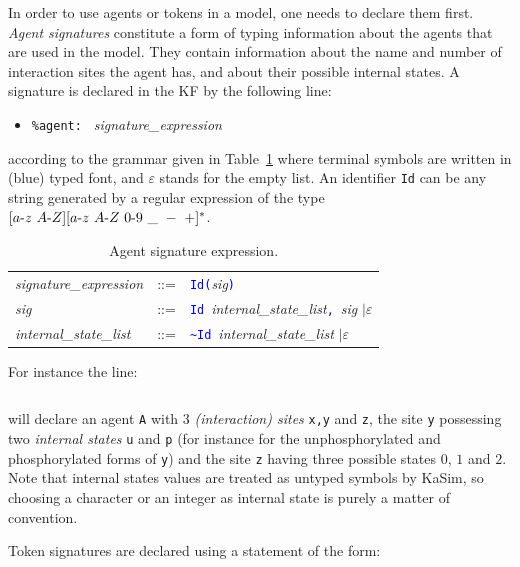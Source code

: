 \documentclass[11pt]{book}
\def\KaSim{\textsf{KaSim}}
\def\sep{\hbox{-}}
\def\intstate{\textasciitilde}
\def\tcb#1{\textcolor{blue}{\ttt{#1}}}
\def\ttt#1{\texttt{#1}}
\def\ITE#1{\begin{itemize}#1\end{itemize}}
\begin{document}
In order to use agents or tokens in a model, one needs to declare them
first. \emph{Agent signatures} constitute a
form of typing information about the agents that are used in the
model. They contain information about the name and number of
interaction sites the agent has, and about their possible internal
states. A signature is declared in the
KF by the following line: \ITE{
\item[] \ttt{\%agent: } \textit{signature\_expression} } according to
the grammar given in Table~\ref{tab:sig} where terminal symbols are
written in (blue) typed font, and $\varepsilon$ stands for the empty
list. An identifier \ttt{Id} can be any string generated by a regular
expression of the type $[a\sep z\ A\sep Z][a\sep z\ A \sep Z\ 0\sep
  9\ \_ \ -\ +]^*$.
\begin{table}[htbp]
  \centering
  \caption{Agent signature %
 expression.}
  \begin{tabular}{@{} lcl @{}}
    \textit{signature\_expression} & ::= &
    \tcb{Id}\tcb{(}\textit{sig}\tcb{)} \\

    \textit{sig} & ::= &
    \tcb{Id}~\textit{internal\_state\_list}\tcb{,}\ \textit{sig}
    $\mid\varepsilon$ \\

    \textit{internal\_state\_list} & ::= &
    \tcb{\intstate{}Id}~\textit{internal\_state\_list}
    $\mid\varepsilon$
    \end{tabular}
  \label{tab:sig}
\end{table}

For instance the line:
\begin{lstlisting}[language=kappa]
%agent: A(x,y~u~p,z~0~1~2) # Signature of agent A
\end{lstlisting}
will declare an agent \ttt{A} with 3 \emph{(interaction) sites}
\ttt{x,y} and \ttt{z}, the site \ttt{y} possessing two
\emph{internal states} \ttt{u} and \ttt{p} (for
instance for the unphosphorylated and phosphorylated forms of \ttt{y})
and the site \ttt{z} having three possible states $0$, $1$ and
$2$. Note that internal states values are
treated as untyped symbols by \KaSim, so choosing a character or an
integer as internal state is purely a matter of convention.

Token signatures are declared using a statement
of the form:
\begin{lstlisting}[language=kappa]
%token: ca+ # Signature of calcium token
\end{lstlisting}
\end{document}
